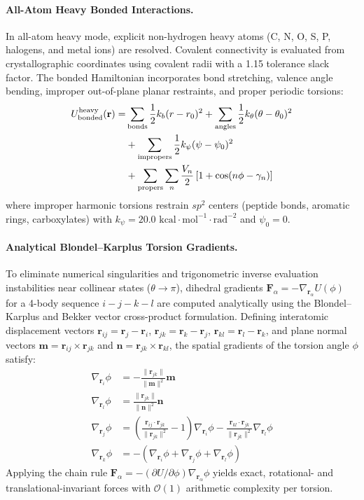 \documentclass[journal=jpcbfk,manuscript=article,layout=twocolumn]{achemso}
\begin{document}
\paragraph{All-Atom Heavy Bonded Interactions.}
In all-atom heavy mode, explicit non-hydrogen heavy atoms (C, N, O, S, P, halogens, and metal ions) are resolved. Covalent connectivity is evaluated from crystallographic coordinates using covalent radii with a 1.15 tolerance slack factor. The bonded Hamiltonian incorporates bond stretching, valence angle bending, improper out-of-plane planar restraints, and proper periodic torsions:\cite{maier2015ff14sb,case2005amber}
\begin{align}
U_{\rm bonded}^{\rm heavy}(\mathbf{r}) = &\sum_{\rm bonds} \frac{1}{2} k_b (r - r_0)^2 + \sum_{\rm angles} \frac{1}{2} k_\theta (\theta - \theta_0)^2 \nonumber \\
&+ \sum_{\rm impropers} \frac{1}{2} k_\psi (\psi - \psi_0)^2 \nonumber \\
&+ \sum_{\rm propers} \sum_{n} \frac{V_n}{2} \left[ 1 + \cos(n\phi - \gamma_n) \right]
\end{align}
where improper harmonic torsions restrain $sp^2$ centers (peptide bonds, aromatic rings, carboxylates) with $k_\psi = 20.0\text{ kcal}\cdot\text{mol}^{-1}\cdot\text{rad}^{-2}$ and $\psi_0 = 0$.

\paragraph{Analytical Blondel--Karplus Torsion Gradients.}
To eliminate numerical singularities and trigonometric inverse evaluation instabilities near collinear states ($\theta \to \pi$), dihedral gradients $\mathbf{F}_\alpha = -\nabla_{\mathbf{r}_\alpha} U(\phi)$ for a 4-body sequence $i-j-k-l$ are computed analytically using the Blondel--Karplus and Bekker vector cross-product formulation.\cite{blondel1991new,bekker1995force} Defining interatomic displacement vectors $\mathbf{r}_{ij} = \mathbf{r}_j - \mathbf{r}_i$, $\mathbf{r}_{jk} = \mathbf{r}_k - \mathbf{r}_j$, $\mathbf{r}_{kl} = \mathbf{r}_l - \mathbf{r}_k$, and plane normal vectors $\mathbf{m} = \mathbf{r}_{ij} \times \mathbf{r}_{jk}$ and $\mathbf{n} = \mathbf{r}_{jk} \times \mathbf{r}_{kl}$, the spatial gradients of the torsion angle $\phi$ satisfy:
\begin{align}
\nabla_{\mathbf{r}_i}\phi &= -\frac{\|\mathbf{r}_{jk}\|}{\|\mathbf{m}\|^2} \mathbf{m} \\
\nabla_{\mathbf{r}_l}\phi &= \frac{\|\mathbf{r}_{jk}\|}{\|\mathbf{n}\|^2} \mathbf{n} \\
\nabla_{\mathbf{r}_j}\phi &= \left( \frac{\mathbf{r}_{ij}\cdot\mathbf{r}_{jk}}{\|\mathbf{r}_{jk}\|^2} - 1 \right) \nabla_{\mathbf{r}_i}\phi - \frac{\mathbf{r}_{kl}\cdot\mathbf{r}_{jk}}{\|\mathbf{r}_{jk}\|^2} \nabla_{\mathbf{r}_l}\phi \\
\nabla_{\mathbf{r}_k}\phi &= - \left( \nabla_{\mathbf{r}_i}\phi + \nabla_{\mathbf{r}_j}\phi + \nabla_{\mathbf{r}_l}\phi \right)
\end{align}
Applying the chain rule $\mathbf{F}_\alpha = -(\partial U / \partial \phi)\nabla_{\mathbf{r}_\alpha}\phi$ yields exact, rotational- and translational-invariant forces with $\mathcal{O}(1)$ arithmetic complexity per torsion.
\end{document}

